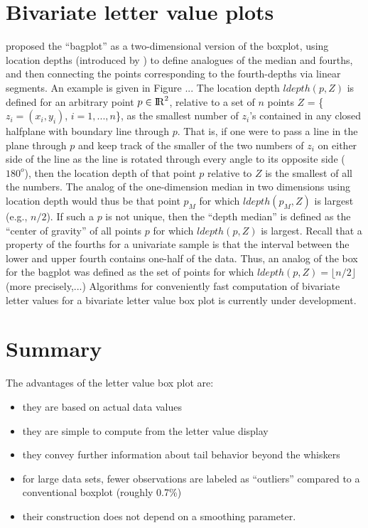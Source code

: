 \documentclass[oneside]{article}
\newcommand{\Reals}{{\rm I\kern-.1667em{}R}}
\begin{document}
\section{Bivariate letter value plots}
\label{sec:bivariate}

\citet{bagplots} proposed the ``bagplot''
as a two-dimensional version of the boxplot, using location 
depths (introduced by \citet{tukey75})
to define analogues of the median and fourths, and then
connecting the points corresponding to the fourth-depths 
via linear segments.  An example is given in Figure ...
The location depth $ldepth(p,Z)$ is defined for an arbitrary 
point $p \in \Reals^2$, relative to a set of $n$ points
$Z$ = \{$z_i = (x_i, y_i)$, $i = 1,...,n$\}, as 
the smallest number of $z_i$'s contained in
any closed halfplane with boundary line through $p$.
That is, if one were to pass a line in the plane through $p$
and keep track of the smaller of the two numbers of $z_i$ on 
either side of the line as the line is rotated through every
angle to its opposite side ($180^o$), then the location depth
of that point $p$ relative to $Z$ is the smallest of all the
numbers.  The analog of the one-dimension median in two
dimensions using location depth would thus be that point
$p_M$ for which $ldepth(p_M, Z)$ is largest (e.g., $n/2$).
If such a $p$ is not unique, then the ``depth median'' is
defined as the ``center of gravity'' of all points $p$ for
which $ldepth(p,Z)$ is largest.  Recall that a property
of the fourths for a univariate sample is that the 
interval between the lower and upper fourth contains
one-half of the data.  Thus, an analog of the box for
the bagplot was defined as the set of points for which
$ldepth(p,Z) = \lfloor n/2 \rfloor$ (more precisely,...)
Algorithms for conveniently fast computation of bivariate letter values 
for a bivariate letter value box plot 
is currently under development.
 



\section{Summary}
\label{sec:summary}

The advantages of the letter value box plot are:
\begin{itemize}
\item 
they are based on actual data values 
\item
they are simple to compute from the letter value display
\item 
they convey further information about tail behavior beyond the whiskers
\item
for large data sets, fewer observations are labeled as ``outliers''
compared to a conventional boxplot (roughly 0.7\%)
\item their construction does not depend on a smoothing parameter.
\end{itemize} 
\end{document}
